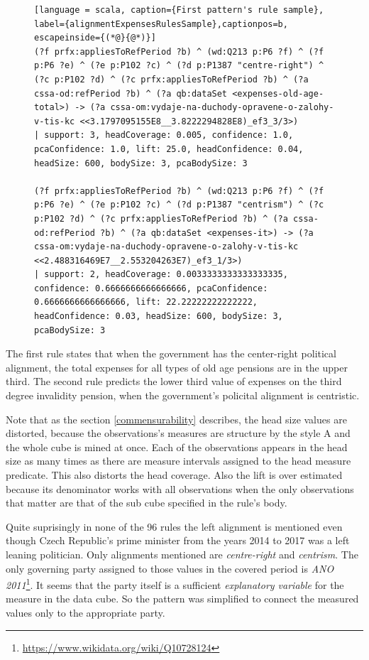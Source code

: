 \begin{figure}[h]
\begin{lstlisting}[language = scala, caption={First pattern's rule sample}, label={alignmentExpensesRulesSample},captionpos=b, escapeinside={(*@}{@*)}]
(?f prfx:appliesToRefPeriod ?b) ^ (wd:Q213 p:P6 ?f) ^ (?f p:P6 ?e) ^ (?e p:P102 ?c) ^ (?d p:P1387 "centre-right") ^ (?c p:P102 ?d) ^ (?c prfx:appliesToRefPeriod ?b) ^ (?a cssa-od:refPeriod ?b) ^ (?a qb:dataSet <expenses-old-age-total>) -> (?a cssa-om:vydaje-na-duchody-opravene-o-zalohy-v-tis-kc <<3.1797095155E8__3.8222294828E8)_ef3_3/3>) 
| support: 3, headCoverage: 0.005, confidence: 1.0, pcaConfidence: 1.0, lift: 25.0, headConfidence: 0.04, headSize: 600, bodySize: 3, pcaBodySize: 3

(?f prfx:appliesToRefPeriod ?b) ^ (wd:Q213 p:P6 ?f) ^ (?f p:P6 ?e) ^ (?e p:P102 ?c) ^ (?d p:P1387 "centrism") ^ (?c p:P102 ?d) ^ (?c prfx:appliesToRefPeriod ?b) ^ (?a cssa-od:refPeriod ?b) ^ (?a qb:dataSet <expenses-it>) -> (?a cssa-om:vydaje-na-duchody-opravene-o-zalohy-v-tis-kc <<2.488316469E7__2.553204263E7)_ef3_1/3>) 
| support: 2, headCoverage: 0.0033333333333333335, confidence: 0.6666666666666666, pcaConfidence: 0.6666666666666666, lift: 22.22222222222222, headConfidence: 0.03, headSize: 600, bodySize: 3, pcaBodySize: 3
\end{lstlisting}
\end{figure}

The first rule states that when the government has the center-right political alignment, the total expenses for all types of old age pensions are in the upper third. The second rule predicts the lower third value of expenses on the third degree invalidity pension, when the government's policital alignment is centristic. 

Note that as the section \ref{commensurability} describes, the head size values are distorted, because the observations's measures are structure by the style A and the whole cube is mined at once. Each of the  observations appears in the head size as many times as there are measure intervals assigned to the head measure predicate. This also distorts the head coverage. Also the lift is over estimated because its denominator works with all  observations when the only observations that matter are that of the sub cube specified in the rule's body.

Quite suprisingly in none of the 96 rules the left alignment is mentioned even though Czech Republic's prime minister from the years 2014 to 2017 was a left leaning politician. Only alignments mentioned are \textit{centre-right} and \textit{centrism}. The only governing party assigned to those values in the covered period is \textit{ANO 2011}\footnote{\href{https://www.wikidata.org/wiki/Q10728124}{https://www.wikidata.org/wiki/Q10728124}}. It seems that the party itself is a sufficient \textit{explanatory variable} for the measure in the data cube. So the pattern was simplified to connect the measured values only to the appropriate party.

